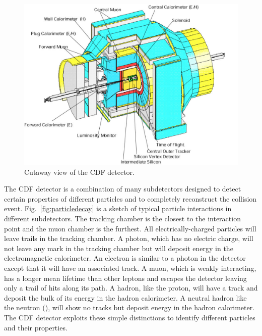 \begin{figure}[hbtm]
\begin{centering}
\includegraphics[scale=0.6]{CDFdetector_cutAwayView.pdf}
\caption{Cutaway view of the CDF detector.}
\label{fig_CDFdetCutAway}
\end{centering}
\end{figure}

The CDF detector is a combination of many subdetectors designed to detect certain properties of different particles and to completely reconstruct the collision event. Fig.~\ref{fig:particledecay} is a sketch of typical particle interactions in different subdetectors. The tracking chamber is the closest to the interaction point and the muon chamber is the furthest. All electrically-charged particles will leave trails in the tracking chamber. A photon, which has no electric charge, will not leave any mark in the tracking chamber but will deposit energy in the electromagnetic calorimeter. An electron is similar to a photon in the detector except that it will have an associated track. A muon, which is weakly interacting, has a longer mean lifetime than other leptons and escapes the detector leaving only a trail of hits along its path. A hadron, like the proton, will have a track and deposit the bulk of its energy in the hadron calorimeter. A neutral hadron like the neutron (), will show no tracks but deposit energy in the hadron calorimeter. The CDF detector exploits these simple distinctions to identify different particles and their properties.

